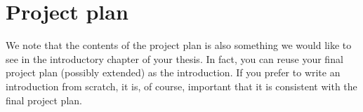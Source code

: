 \section{Project plan}
We note that the contents of the project plan is also something we would like to see in the introductory chapter of your thesis. In fact, you can reuse your final project plan (possibly extended) as the introduction. If you prefer to write an introduction from scratch, it is, of course, important that it is consistent with the final project plan.



%
%

